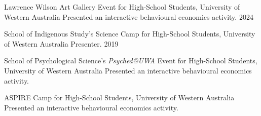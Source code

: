 

\begin{cvhonors}

  \cvhonor
    {Lawrence Wilson Art Gallery Event for High-School Students, University of Western Australia} %
    {Presented an interactive behavioural economics activity.} %
    {} %
    {2024} %
    
  \cvhonor
    {School of Indigenous Study's Science Camp for High-School Students, University of Western Australia} %
    {Presenter.} %
    {} %
    {2019} %
    
  \cvhonor
    {School of Psychological Science's \textit{Psyched@UWA} Event for High-School Students, University of Western Australia} %
    {Presented an interactive behavioural economics activity.} %
    {} %
    {} %
    
    \cvhonor
    {ASPIRE Camp for High-School Students, University of Western Australia} %
    {Presented an interactive behavioural economics activity.} %
    {} %
    {} %

    
\end{cvhonors}

